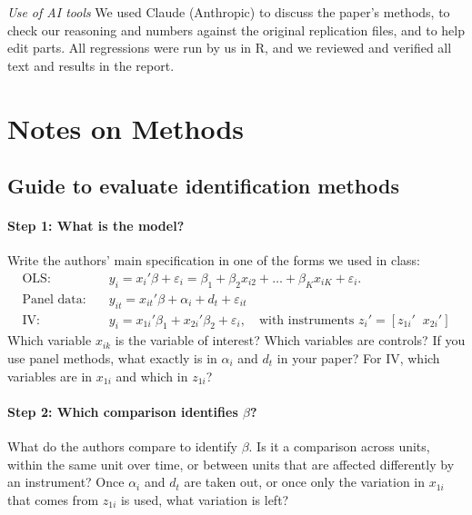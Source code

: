 \documentclass[12pt,a4paper]{article}
\newif\ifshowinstr
\newcommand{\instr}[1]{\ifshowinstr{\leavevmode\color{gray}\itshape\small [#1]\par}\fi}
\begin{document}
\textit{Use of AI tools} We used Claude (Anthropic) to discuss the paper's methods, to check our reasoning and numbers against the original replication files, and to help edit parts. All regressions were run by us in R, and we reviewed and verified all text and results in the report.

\clearpage
\section{Notes on Methods}

\instr{Delete this appendix before submitting.}

\subsection{Guide to evaluate identification methods}


\paragraph{Step 1: What is the model?}
Write the authors' main specification in one of the forms we used in class:
\begin{align*}
  \text{OLS:} \quad & y_i = x_i'\beta + \varepsilon_i = \beta_1 + \beta_2 x_{i2} + \dots + \beta_K x_{iK} + \varepsilon_i . \\
  \text{Panel data:} \quad & y_{it} = x_{it}'\beta + \alpha_i + d_t + \varepsilon_{it} \\
  \text{IV:} \quad & y_i = x_{1i}'\beta_1 + x_{2i}'\beta_2 + \varepsilon_i,
     \quad \text{with instruments } z_i' = [z_{1i}' \;\; x_{2i}']
\end{align*}
Which variable $x_{ik}$ is the variable of interest? Which variables are controls? If you use panel methods, what exactly is in $\alpha_i$ and $d_t$ in your paper? For IV, which variables are in $x_{1i}$ and which in $z_{1i}$?
 
\paragraph{Step 2: Which comparison identifies $\beta$?}
What do the authors compare to identify $\beta$. Is it a comparison across units, within the same unit over time, or between units that are affected differently by an instrument? Once $\alpha_i$ and $d_t$ are taken out, or once only the variation in $x_{1i}$ that comes from $z_{1i}$ is used, what variation is left?
 
\end{document}
